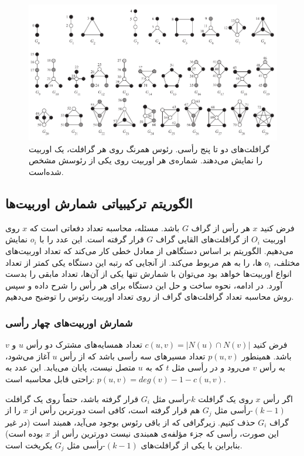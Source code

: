\begin{figure}[t]
\centering
\includegraphics[scale=0.4]{./graphlets.png}
\caption[گرافلت‌ها]{گرافلت‌های دو تا پنج رأسی. رئوس همرنگ روی هر گرافلت، یک اوربیت را نمایش می‌دهند. شماره‌ی هر اوربیت روی یکی از رئوسش مشخص شده‌است.}
\label{fig:graphlets}
\end{figure}

\subsection{الگوریتم ترکیبیاتی شمارش اوربیت‌ها}
فرض کنید $x$ هر رأس از گراف $G$ باشد. مسئله، محاسبه تعداد دفعاتی است که $x$  روی اوربیت $O_i$ از گرافلت‌های القایی گراف $G$ قرار گرفته است. این عدد را با $o_i$ نمایش می‌دهیم. الگوریتم بر اساس دستگاهی از معادل خطی کار می‌کند که تعداد اوربیت‌های مختلف، $o_i$ ها، را به هم مربوط می‌کند. از آنجایی که رتبه این دستگاه یکی کمتر از تعداد انواع اوربیت‌ها خواهد بود می‌توان با شمارش تنها یکی از آن‌ها، تعداد مابقی را بدست آورد. در ادامه، نحوه ساخت و حل این دستگاه برای هر رأس را شرح داده و سپس روش محاسبه تعداد گرافلت‌های گراف از روی تعداد اوربیت رئوس را توضیح می‌دهیم.

\subsubsection{شمارش اوربیت‌های چهار رأسی}
فرض کنید $c(u,v) = |N(u) \cap N(v)|$ تعداد همسایه‌های مشترک دو رأس $u$ و $v$ باشد. همینطور $p(u,v)$ تعداد مسیرهای سه رأسی باشد که از رأس $u$ آغاز می‌شود، به رأس $v$ می‌رود و در رأسی مثل $t$ که به $u$ متصل نیست، پایان می‌یابد. این عدد به راحتی قابل محاسبه است: 
$p(u,v) = deg(v) -1 -c(u,v)$.

اگر رأس $x$ روی یک گرافلت $k$-رأسی مثل $G_i$ قرار گرفته باشد، حتماً روی یک گرافلت $(k-1)$-رأسی مثل $G_j$ هم قرار گرفته است، کافی است دورترین رأس از $x$ را از گراف $G_i$ حذف کنیم. زیرگرافی که از باقی رئوس بوجود می‌آید، همبند است (در غیر این صورت، رأسی که جزء مؤلفه‌ی همبندی نیست دورترین رأس از $x$ بوده است) بنابراین با یکی از گرافلت‌های $(k-1)$-رأسی مثل $G_j$ یکریخت است.

